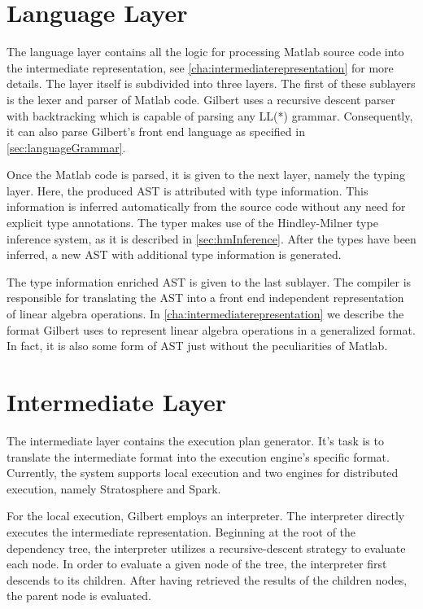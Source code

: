 \section{Language Layer}

The language layer contains all the logic for processing Matlab source code into the intermediate representation, see \cref{cha:intermediaterepresentation} for more details.
The layer itself is subdivided into three layers.
The first of these sublayers is the lexer and parser of Matlab code.
Gilbert uses a recursive descent parser with backtracking which is capable of parsing any LL(*) grammar.
Consequently, it can also parse Gilbert's front end language as specified in \cref{sec:languageGrammar}.

Once the Matlab code is parsed, it is given to the next layer, namely the typing layer.
Here, the produced AST is attributed with type information.
This information is inferred automatically from the source code without any need for explicit type annotations.
The typer makes use of the Hindley-Milner type inference system, as it is described in \cref{sec:hmInference}.
After the types have been inferred, a new AST with additional type information is generated.

The type information enriched AST is given to the last sublayer.
The compiler is responsible for translating the AST into a front end independent representation of linear algebra operations.
In \cref{cha:intermediaterepresentation} we describe the format Gilbert uses to represent linear algebra operations in a generalized format.
In fact, it is also some form of AST just without the peculiarities of Matlab.

\section{Intermediate Layer}

The intermediate layer contains the execution plan generator.
It's task is to translate the intermediate format into the execution engine's specific format.
Currently, the system supports local execution and two engines for distributed execution, namely Stratosphere and Spark.

For the local execution, Gilbert employs an interpreter.
The interpreter directly executes the intermediate representation.
Beginning at the root of the dependency tree, the interpreter utilizes a recursive-descent strategy to evaluate each node.
In order to evaluate a given node of the tree, the interpreter first descends to its children.
After having retrieved the results of the children nodes, the parent node is evaluated.

